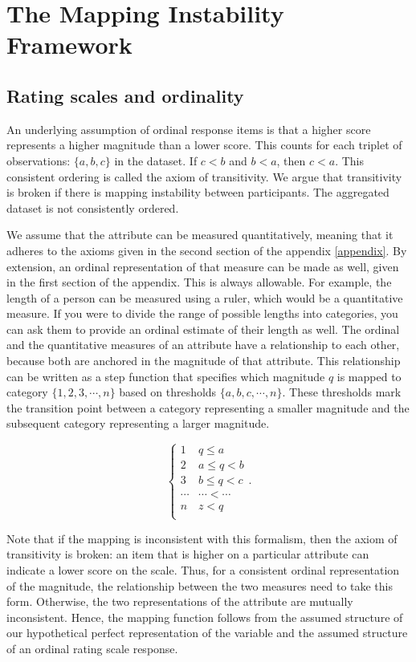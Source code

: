 \documentclass[titlepage, a4paper, 11pt]{article}
\begin{document}
\section{The Mapping Instability Framework}
\subsection{Rating scales and ordinality} 
An underlying assumption of ordinal response items is that a higher score represents a higher magnitude than a lower score. This counts for each triplet of observations: $\{a, b, c\}$ in the dataset. If $c < b$ and $b < a$, then $c < a$. This consistent ordering is called the axiom of transitivity. We argue that transitivity is broken if there is mapping instability between participants. The aggregated dataset is not consistently ordered.

We assume that the attribute can be measured quantitatively, meaning that it adheres to the axioms given in the second section of the appendix \ref{appendix}. By extension, an ordinal representation of that measure can be made as well, given in the first section of the appendix. This is always allowable. For example, the length of a person can be measured using a ruler, which would be a quantitative measure. If you were to divide the range of possible lengths into categories, you can ask them to provide an ordinal estimate of their length as well.
The ordinal and the quantitative measures of an attribute have a relationship to each other, because both are anchored in the magnitude of that attribute. This relationship can be written as a step function that specifies which magnitude $q$ is mapped to category $\{ 1, 2, 3, \cdots, n \}$ based on thresholds $\{a, b, c, \cdots, n \}$. These thresholds mark the transition point between a category representing a smaller magnitude and the subsequent category representing a larger magnitude.

\[
\begin{cases} 
    1 & q \leq a\\
    2 & a \leq q < b\\
    3 & b \leq q < c\\
    \cdots & \cdots < \cdots \\
    n & z < q\\
\end{cases}.
\]

Note that if the mapping is inconsistent with this formalism, then the axiom of transitivity is broken: an item that is higher on a particular attribute can indicate a lower score on the scale. Thus, for a consistent ordinal representation of the magnitude, the relationship between the two measures need to take this form. Otherwise, the two representations of the attribute are mutually inconsistent. Hence, the mapping function follows from the assumed structure of our hypothetical perfect representation of the variable and the assumed structure of an ordinal rating scale response. 
\end{document}
